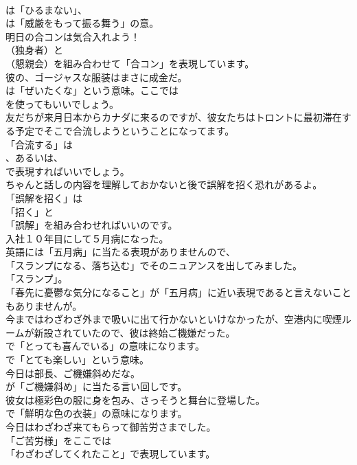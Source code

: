 \documentclass[8pt]{extreport}
\begin{document}
\begin{CJK}{UTF8}{min}
\\	は「ひるまない」、
\\	は「威厳をもって振る舞う」の意。	
\\	明日の合コンは気合入れよう！ 
\\	（独身者）と 
\\	（懇親会）を組み合わせて「合コン」を表現しています。	
\\	彼の、ゴージャスな服装はまさに成金だ。 
\\	は「ぜいたくな」という意味。ここでは 
\\	を使ってもいいでしょう。	
\\	友だちが来月日本からカナダに来るのですが、彼女たちはトロントに最初滞在する予定でそこで合流しようということになってます。 
\\	「合流する」は 
\\	、あるいは、
\\	で表現すればいいでしょう。	
\\	ちゃんと話しの内容を理解しておかないと後で誤解を招く恐れがあるよ。 
\\	「誤解を招く」は
\\	「招く」と
\\	「誤解」を組み合わせればいいのです。	
\\	入社１０年目にして５月病になった。 
\\	英語には「五月病」に当たる表現がありませんので、
\\	「スランプになる、落ち込む」でそのニュアンスを出してみました。
\\	「スランプ」。
\\	「春先に憂鬱な気分になること」が「五月病」に近い表現であると言えないこともありませんが。	
\\	今まではわざわざ外まで吸いに出て行かないといけなかったが、空港内に喫煙ルームが新設されていたので、彼は終始ご機嫌だった。 
\\	で「とっても喜んでいる」の意味になります。
\\	で「とても楽しい」という意味。	
\\	今日は部長、ご機嫌斜めだな。 
\\	が「ご機嫌斜め」に当たる言い回しです。	
\\	彼女は極彩色の服に身を包み、さっそうと舞台に登場した。 
\\	で「鮮明な色の衣装」の意味になります。	
\\	今日はわざわざ来てもらって御苦労さまでした。 
\\	「ご苦労様」をここでは
\\	「わざわざしてくれたこと」で表現しています。	

\end{CJK}
\end{document}
